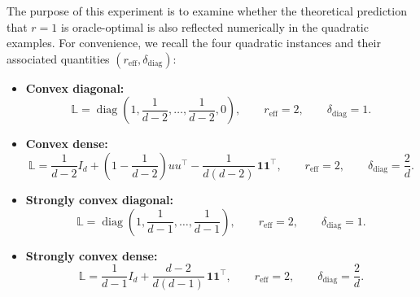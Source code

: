 \documentclass[10pt]{article}
\newcommand{\diag}{\operatorname{diag}}
\newcommand{\Lmat}{\mathbb{L}}
\begin{document}
The purpose of this experiment is to examine whether the theoretical prediction
that \(r=1\) is oracle-optimal is also reflected numerically in the quadratic examples.
For convenience, we recall the four quadratic instances and their associated quantities
\((r_{\mathrm{eff}},\delta_{\mathrm{diag}})\):

\begin{itemize}
    \item \textbf{Convex diagonal:}
    \[
    \Lmat
    =
    \diag\!\left(
    1,\frac{1}{d-2},\ldots,\frac{1}{d-2},0
    \right),
    \qquad
    r_{\mathrm{eff}}=2,
    \qquad
    \delta_{\mathrm{diag}}=1.
    \]

    \item \textbf{Convex dense:}
    \[
    \Lmat
    =
    \frac{1}{d-2}I_d
    +
    \left(1-\frac{1}{d-2}\right)uu^\top
    -
    \frac{1}{d(d-2)}\,\mathbf{1}\mathbf{1}^\top,
    \qquad
    r_{\mathrm{eff}}=2,
    \qquad
    \delta_{\mathrm{diag}}=\frac{2}{d}.
    \]

    \item \textbf{Strongly convex diagonal:}
    \[
    \Lmat
    =
    \diag\!\left(
    1,\frac{1}{d-1},\ldots,\frac{1}{d-1}
    \right),
    \qquad
    r_{\mathrm{eff}}=2,
    \qquad
    \delta_{\mathrm{diag}}=1.
    \]

    \item \textbf{Strongly convex dense:}
    \[
    \Lmat
    =
    \frac{1}{d-1}I_d
    +
    \frac{d-2}{d(d-1)}\,\mathbf{1}\mathbf{1}^\top,
    \qquad
    r_{\mathrm{eff}}=2,
    \qquad
    \delta_{\mathrm{diag}}=\frac{2}{d}.
    \]
\end{itemize}
\end{document}
